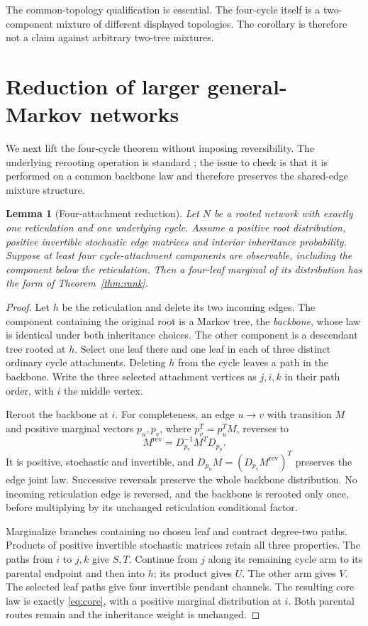 \documentclass[11pt]{article}
\newtheorem{lemma}[theorem]{Lemma}
\theoremstyle{definition}
\theoremstyle{remark}
\begin{document}
The common-topology qualification is essential. The four-cycle itself is a
two-component mixture of different displayed topologies. The corollary is
therefore not a claim against arbitrary two-tree mixtures.

\section{Reduction of larger general-Markov networks}\label{sec:gm-large}

We next lift the four-cycle theorem without imposing reversibility. The
underlying rerooting operation is standard \cite[Proposition 6]{Snyman2023};
the issue to check is that it is performed on a common backbone law and
therefore preserves the shared-edge mixture structure.

\begin{lemma}[Four-attachment reduction]\label{lem:gm-reduction}
Let $N$ be a rooted network with exactly one reticulation and one underlying
cycle. Assume a positive root distribution, positive invertible stochastic
edge matrices and interior inheritance probability. Suppose at least four
cycle-attachment components are observable, including the component below
the reticulation. Then a four-leaf marginal of its distribution has the
form of Theorem~\ref{thm:rank}.
\end{lemma}
\begin{proof}
Let $h$ be the reticulation and delete its two incoming edges. The component
containing the original root is a Markov tree, the \emph{backbone}, whose
law is identical under both inheritance choices. The other component is a
descendant tree rooted at $h$. Select one leaf there and one leaf in each
of three distinct ordinary cycle attachments. Deleting $h$ from the cycle
leaves a path in the backbone. Write the three selected attachment vertices
as $j,i,k$ in their path order, with $i$ the middle vertex.

Reroot the backbone at $i$. For completeness, an edge $u\to v$ with
transition $M$ and positive marginal vectors $p_u,p_v$, where
$p_v^T=p_u^TM$, reverses to
\begin{equation}\label{eq:bayes-reverse}
 M^{\mathrm{rev}}=D_{p_v}^{-1}M^TD_{p_u}.
\end{equation}
It is positive, stochastic and invertible, and
$D_{p_u}M=(D_{p_v}M^{\mathrm{rev}})^T$ preserves the edge joint law.
Successive reversals preserve the whole backbone distribution. No incoming
reticulation edge is reversed, and the backbone is rerooted only once,
before multiplying by its unchanged reticulation conditional factor.

Marginalize branches containing no chosen leaf and contract degree-two
paths. Products of positive invertible stochastic matrices retain all
three properties. The paths from $i$ to $j,k$ give $S,T$. Continue from
$j$ along its remaining cycle arm to its parental endpoint and then into
$h$; its product gives $U$. The other arm gives $V$. The selected leaf
paths give four invertible pendant channels. The resulting core law is
exactly \eqref{eq:core}, with a positive marginal distribution at $i$.
Both parental routes remain and the inheritance weight is unchanged.
\end{proof}
\end{document}
